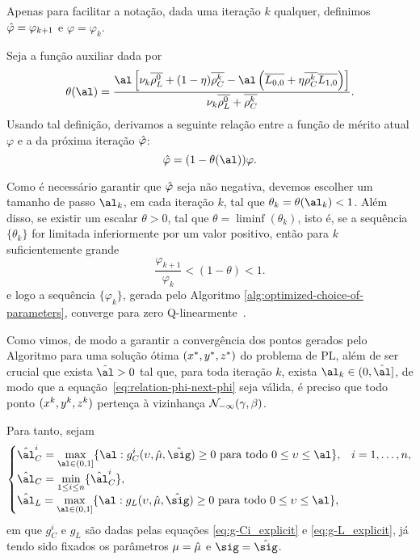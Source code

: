 Apenas para facilitar a notação, dada uma iteração $k$ qualquer, definimos $\hat{\varphi} = \varphi_{k+1}$ e $\varphi = \varphi_{k}$.

Seja a função auxiliar  dada por
\begin{equation}
	\label{eq:theta}
\theta(\al) =  \dfrac{\al\left[ \nuk \dbvec{\rho_L^{0}} + (1-\eta)\rhoCkb  - \al\left(\dbvec{L_{0,0}} + \eta\rhoCkb  \dbvec{L_{1,0}}
\right) \right]}{\nuk \dbvec{\rho_L^{0}} +
\rhoCkb }.
\end{equation}
Usando tal definição, derivamos a seguinte relação entre a função de mérito atual  $\varphi$  e a da próxima iteração  $\hat{\varphi}$: 
\begin{equation}
	\label{eq:relation-phi-next-phi}
	 			{\nextphi} = (1- \theta(\al))\varphi.
\end{equation}


Como é necessário garantir que  $\hat{\varphi}  $  seja não negativa, devemos escolher um tamanho de passo  $\al_k$, em cada iteração $k$, tal que  $\theta_k = \theta(\al_k)<1$. Além disso, se existir um escalar $\theta>0$, tal que $\theta = \liminf (\theta_k)$, isto é, se a sequência $\{\theta_k\}$ for limitada inferiormente por um valor positivo,	 então para $k$ suficientemente grande
\begin{equation}\label{eq:nextphi-philessthan1}
\frac{{\varphi_{k+1}}}{\varphi_{k}} < (1- \theta) < 1.
\end{equation}
e logo a sequência $\{\varphi_k\}$, gerada pelo Algoritmo \ref{alg:optimized-choice-of-parameters}, converge para zero Q-linearmente~\cite{Ortega:2000vd}.




Como vimos, de modo a garantir a convergência dos pontos gerados pelo Algoritmo para uma solução ótima $(x^*,y^*,z^*)$ do problema de \ac{PL}, além de ser  crucial que exista $\hat{\al}>0$  tal que,  para toda iteração $k$, exista  $\al_k\in(0,\hat{\al}]$, de modo que a equação~\eqref{eq:relation-phi-next-phi} seja válida, é preciso que todo   ponto  $(x^{k} ,y^{k},z^{k})$ pertença à vizinhança $\mathcal{N}_{-\infty}(\gamma,\beta)$.

Para tanto, sejam  
\begin{equation}
	\label{eq:al-C+al-L}
\begin{cases}
	\hat{\al}_{C}^{i} = \displaystyle \max_{\al\in (0,1]} \{ \al : g_{C}^{i}(\upsilon,\nextmu,\nextsig)\geq0 \text{ para todo } 0 \leq \upsilon\leq \al  \}, & i = 1,\ldots,n,\\
	\hat{\al}_{C} = \displaystyle \min_{1\leq i \leq n} \{\hat{\al}_{C}^{i}\}, \\
	\hat{\al}_{L} = \displaystyle \max_{\al\in (0,1]} \{ \al : g_{L}(\upsilon,\nextmu,\nextsig)\geq0 \text{ para todo } 0 \leq  \upsilon\leq \al  \},
\end{cases}
\end{equation}
em que $g_{C}^{i}$ e $g_{L}$ são dadas pelas equações  \eqref{eq:g-Ci_explicit} e \eqref{eq:g-L_explicit}, já tendo sido fixados os parâmetros $\mu=\hat{\mu}$ e $\sig=\nextsig$.


